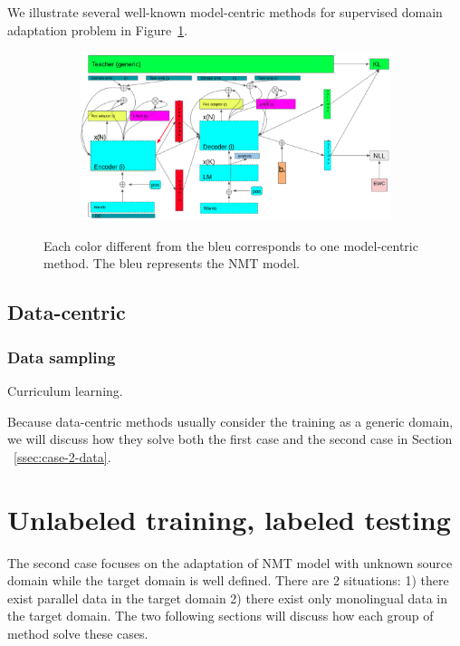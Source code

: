 We illustrate several well-known model-centric methods for supervised domain adaptation problem in Figure~\ref{fig:model-centric-case1-case2}.
\begin{figure}[htbp]
\begin{subfigure}{1.0\textwidth}
  \centering
  \includegraphics[width=1.0\textwidth]{graphics/supervised_mdmt}
\end{subfigure}
\newline
\begin{subfigure}{1.0\textwidth}
  \centering
\end{subfigure}
\caption{Each color different from the bleu corresponds to one model-centric method. The bleu represents the NMT model.}
\label{fig:model-centric-case1-case2}
\end{figure}

\subsection{Data-centric}
\subsubsection{Data sampling}
Curriculum learning.


Because data-centric methods usually consider the training as a generic domain, we will discuss how they solve both the first case and the second case in Section ~\ref{ssec:case-2-data}.

\section{Unlabeled training, labeled testing}
\label{sec:case2}
The second case focuses on the adaptation of NMT model with unknown source domain while the target domain is well defined. There are 2 situations: 1) there exist parallel data in the target domain 2) there exist only monolingual data in the target domain. The two following sections will discuss how each group of method solve these cases.
